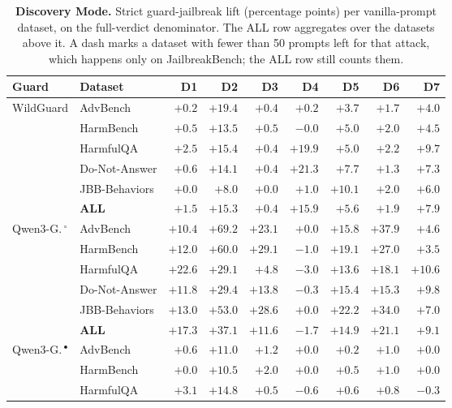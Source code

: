 \begin{table}[htbp]
\caption{\NEWr \textbf{Discovery Mode.} Strict guard-jailbreak lift (percentage points) per vanilla-prompt dataset, on the full-verdict denominator. The ALL row aggregates over the datasets above it. A dash marks a dataset with fewer than 50 prompts left for that attack, which happens only on JailbreakBench; the ALL row still counts them.}
\label{tab:gj-lift-discovery}
\centering\scriptsize
\setlength{\tabcolsep}{3pt}
\begin{tabular}{l l r r r r r r r}
\toprule
Guard & Dataset & D1 & D2 & D3 & D4 & D5 & D6 & D7 \\
\midrule
\multirow{6}{*}{WildGuard}
 & AdvBench & $+0.2$ & $+19.4$ & $+0.4$ & $+0.2$ & $+3.7$ & $+1.7$ & $+4.0$ \\
 & HarmBench & $+0.5$ & $+13.5$ & $+0.5$ & $-0.0$ & $+5.0$ & $+2.0$ & $+4.5$ \\
 & HarmfulQA & $+2.5$ & $+15.4$ & $+0.4$ & $+19.9$ & $+5.0$ & $+2.2$ & $+9.7$ \\
 & Do-Not-Answer & $+0.6$ & $+14.1$ & $+0.4$ & $+21.3$ & $+7.7$ & $+1.3$ & $+7.3$ \\
 & JBB-Behaviors & $+0.0$ & $+8.0$ & $+0.0$ & $+1.0$ & $+10.1$ & $+2.0$ & $+6.0$ \\
 & \textbf{ALL} & $+1.5$ & $+15.3$ & $+0.4$ & $+15.9$ & $+5.6$ & $+1.9$ & $+7.9$ \\
\midrule
\multirow{6}{*}{Qwen3-G.\,$^{\circ}$}
 & AdvBench & $+10.4$ & $+69.2$ & $+23.1$ & $+0.0$ & $+15.8$ & $+37.9$ & $+4.6$ \\
 & HarmBench & $+12.0$ & $+60.0$ & $+29.1$ & $-1.0$ & $+19.1$ & $+27.0$ & $+3.5$ \\
 & HarmfulQA & $+22.6$ & $+29.1$ & $+4.8$ & $-3.0$ & $+13.6$ & $+18.1$ & $+10.6$ \\
 & Do-Not-Answer & $+11.8$ & $+29.4$ & $+13.8$ & $-0.3$ & $+15.4$ & $+15.3$ & $+9.8$ \\
 & JBB-Behaviors & $+13.0$ & $+53.0$ & $+28.6$ & $+0.0$ & $+22.2$ & $+34.0$ & $+7.0$ \\
 & \textbf{ALL} & $+17.3$ & $+37.1$ & $+11.6$ & $-1.7$ & $+14.9$ & $+21.1$ & $+9.1$ \\
\midrule
\multirow{6}{*}{Qwen3-G.\,$^{\bullet}$}
 & AdvBench & $+0.6$ & $+11.0$ & $+1.2$ & $+0.0$ & $+0.2$ & $+1.0$ & $+0.0$ \\
 & HarmBench & $+0.0$ & $+10.5$ & $+2.0$ & $+0.0$ & $+0.5$ & $+1.0$ & $+0.0$ \\
 & HarmfulQA & $+3.1$ & $+14.8$ & $+0.5$ & $-0.6$ & $+0.6$ & $+0.8$ & $-0.3$ \\

\end{tabular}
\end{table}
